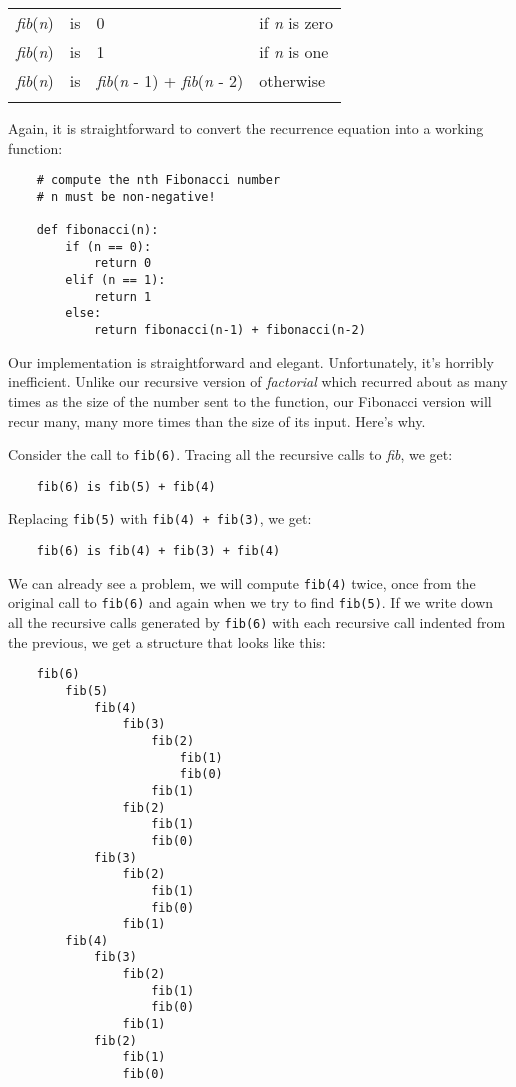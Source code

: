\begin{center}
\begin{tabular}{lcll}%
\T\toprule
    {\it fib}({\it n}) & is & 0 & if {\it n} is zero\\
    {\it fib}({\it n}) & is & 1 & if {\it n} is one\\
    {\it fib}({\it n}) & is & {\it fib}({\it n} - 1) + {\it fib}({\it n} - 2) & otherwise\\
\T\bottomrule
\end{tabular}
\end{center}

Again, it is straightforward to convert the recurrence equation
into a working function:
 
\begin{verbatim}
    # compute the nth Fibonacci number
    # n must be non-negative!
    
    def fibonacci(n):
        if (n == 0):
            return 0
        elif (n == 1):
            return 1
        else:
            return fibonacci(n-1) + fibonacci(n-2)
\end{verbatim}

Our implementation is straightforward and elegant. Unfortunately, it's
horribly inefficient. Unlike our recursive version of
{\it factorial} which
recurred about as many times as the size of the number sent to the function,
our Fibonacci version will recur many, many more times than the size of
its input.  Here's why.

Consider the call to \verb!fib(6)!.
Tracing all the recursive calls to {\it fib}, we get:

\begin{verbatim}
    fib(6) is fib(5) + fib(4)
\end{verbatim}

Replacing \verb!fib(5)! with \verb!fib(4) + fib(3)!,
we get:

\begin{verbatim}
    fib(6) is fib(4) + fib(3) + fib(4)
\end{verbatim}

We can already see a problem, we will compute \verb!fib(4)! twice,
once from the original call to \verb!fib(6)! and again when we
try to find \verb!fib(5)!.
If we write down all the recursive calls generated by \verb!fib(6)!
with each recursive call indented from the previous, we
get a structure that looks like this:

\begin{verbatim}
    fib(6)
        fib(5)
            fib(4)
                fib(3)
                    fib(2)
                        fib(1)
                        fib(0)
                    fib(1)
                fib(2)
                    fib(1)
                    fib(0)
            fib(3)
                fib(2)
                    fib(1)
                    fib(0)
                fib(1)
        fib(4)
            fib(3)
                fib(2)
                    fib(1)
                    fib(0)
                fib(1)
            fib(2)
                fib(1)
                fib(0)
\end{verbatim}

